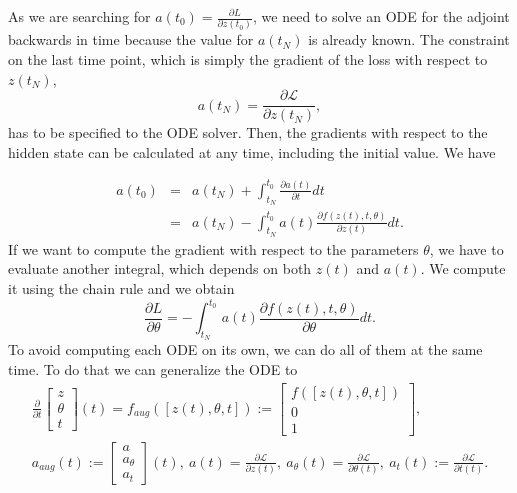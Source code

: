 \documentclass[10pt,a4paper]{article}
\theoremstyle{definition}
\theoremstyle{plain}
\begin{document}
As we are searching for $ a(t_0) = \frac{\partial L}{\partial z(t_0)}$, we need to solve an ODE for the adjoint backwards in time because the value for $a(t_N)$ is already known. The constraint on the last time point, which is simply the gradient of the loss with respect to $z(t_N)$, 
\begin{equation*}
a(t_N) = \frac{\partial \mathcal{L}}{\partial z(t_N)},
\end{equation*}
has to be specified to the ODE solver. Then, the gradients with respect to the hidden state can be calculated at any time, including the initial value. We have 

\begin{eqnarray*}
a(t_0) &=& a(t_N) + \int^{t_0}_{t_N} \frac{\partial a(t)}{\partial t} dt\\
	   &=& a(t_N) - \int^{t_0}_{t_N} a(t) \frac{\partial f(z(t),t,\theta)} {\partial z(t)} dt.
\end{eqnarray*}
If we want to compute the gradient with respect to the parameters $\theta$, we have to evaluate another integral, which depends on both $z(t)$ and $a(t)$. We compute it using the chain rule and we obtain
\begin{equation}
\label{devtheta}
\frac{\partial L}{\partial \theta} = - \int^{t_0}_{t_N} a(t) \frac{\partial f(z(t),t,\theta)} {\partial \theta} dt.
\end{equation}
To avoid computing each ODE on its own, we can do all of them at the same time. To do that we can generalize the ODE to
\begin{eqnarray*}
\frac{\partial}{\partial t} \begin{bmatrix}
							z \\ \theta \\ t
							\end{bmatrix} (t) 
= f_{aug}([z(t),\theta ,t]) := \begin{bmatrix}
							f([z(t),\theta ,t]) \\ 0 \\ 1
							\end{bmatrix}, \\
a_{aug} (t) := \begin{bmatrix}
			a \\ a_{\theta} \\ a_t
			\end{bmatrix} (t) , \ 
a(t) = \frac{\partial \mathcal{L}}{\partial z(t)}, \ 
a_\theta (t) = \frac{\partial \mathcal{L}}{\partial \theta (t)}, \ 
a_t(t) := \frac{\partial \mathcal{L}}{\partial t(t)}.
\end{eqnarray*}
\end{document}
